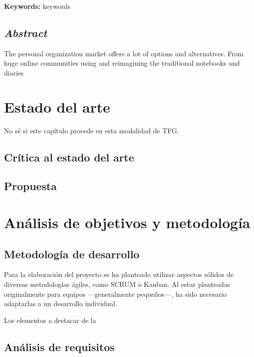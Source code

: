\documentclass[10pt, a4paper]{aqademic}
\begin{document}
\newpage


\textbf{Keywords:} keywords


\section{\textit{Abstract}}

The personal organization market offers a lot of options and alternatives. From huge online communities using and reimagining the traditional notebooks and diaries


\chapter{Estado del arte}

No sé si este capítulo procede en esta modalidad de TFG.

\section{Crítica al estado del arte}

\section{Propuesta}


\chapter{Análisis de objetivos y metodología}

\section{Metodología de desarrollo}

Para la elaboración del proyecto se ha planteado utilizar aspectos sólidos de diversas metodologías ágiles, como SCRUM \cite{schwaber2017scrum} o Kanban. Al estar planteadas originalmente para equipos ---generalmente pequeños---, ha sido necesario adaptarlas a un desarrollo individual.

\medskip

Los elementos a destacar de la 

\section{Análisis de requisitos}
\end{document}
